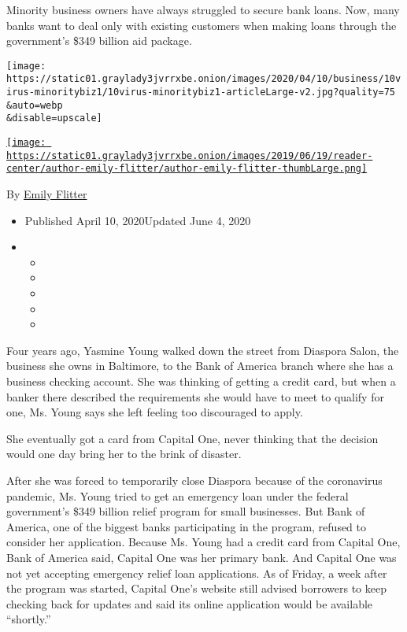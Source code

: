 Minority business owners have always struggled to secure bank loans.
Now, many banks want to deal only with existing customers when making
loans through the government's \$349 billion aid package.

\texttt{[image: https://static01.graylady3jvrrxbe.onion/images/2020/04/10/business/10virus-minoritybiz1/10virus-minoritybiz1-articleLarge-v2.jpg?quality=75\\\&auto=webp\\\&disable=upscale]}

\href{https://www.nytimes3xbfgragh.onion/by/emily-flitter}{\texttt{[image: https://static01.graylady3jvrrxbe.onion/images/2019/06/19/reader-center/author-emily-flitter/author-emily-flitter-thumbLarge.png]}}

By \href{https://www.nytimes3xbfgragh.onion/by/emily-flitter}{Emily
Flitter}

\begin{itemize}
\item
  Published April 10, 2020Updated June 4, 2020
\item
  \begin{itemize}
  \item
  \item
  \item
  \item
  \item
  \end{itemize}
\end{itemize}

Four years ago, Yasmine Young walked down the street from Diaspora
Salon, the business she owns in Baltimore, to the Bank of America branch
where she has a business checking account. She was thinking of getting a
credit card, but when a banker there described the requirements she
would have to meet to qualify for one, Ms. Young says she left feeling
too discouraged to apply.

She eventually got a card from Capital One, never thinking that the
decision would one day bring her to the brink of disaster.

After she was forced to temporarily close Diaspora because of the
coronavirus pandemic, Ms. Young tried to get an emergency loan under the
federal government's \$349 billion relief program for small businesses.
But Bank of America, one of the biggest banks participating in the
program, refused to consider her application. Because Ms. Young had a
credit card from Capital One, Bank of America said, Capital One was her
primary bank. And Capital One was not yet accepting emergency relief
loan applications. As of Friday, a week after the program was started,
Capital One's website still advised borrowers to keep checking back for
updates and said its online application would be available ``shortly.''

